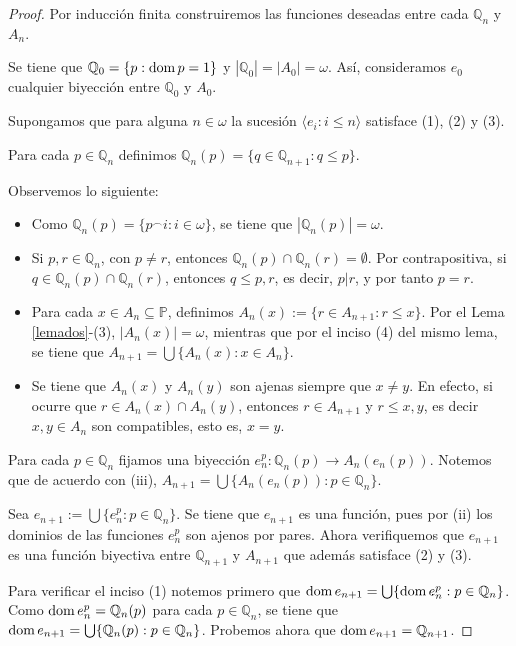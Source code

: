 \documentclass[11pt]{unam_tesis1}
\theoremstyle{MyThmStyle}
\theoremstyle{definition}
\theoremstyle{plain}
\theoremstyle{remark}
\def\dom{\mathop{\rm dom}\nolimits}
\let\leq\leqslant
\begin{document}
\begin{proof}
Por inducci\'on finita construiremos las funciones deseadas entre cada $\mathbb Q_n$ y $A_n$.

Se tiene que $\mathbb Q_0=\{p: \dom p=1\}$ y $|\mathbb Q_0|=|A_0|=\omega$. As\'i, consideramos $e_0$ cualquier biyecci\'on entre $\mathbb Q_0$ y $A_0$.

Supongamos que para alguna $n\in \omega$ la sucesi\'on $\langle e_i:i\leq n \rangle$ satisface (1), (2) y (3). 

Para cada $p\in \mathbb Q_n$ definimos $\mathbb Q_n(p)=\{q\in \mathbb Q_{n+1}:q\leq p\}$.

Observemos lo siguiente:

\begin{itemize}

\item [(i)]Como $\mathbb Q_n(p)=\{p^{\frown} i:i\in \omega \}$, se tiene que $|\mathbb Q_n(p)|=\omega$.
\item [(ii)]Si $p,r\in \mathbb Q_n$, con $p\neq r$, entonces $\mathbb Q_n(p)\cap \mathbb Q_n(r)=\emptyset$. Por contrapositiva, si $q\in \mathbb Q_n(p)\cap \mathbb Q_n(r)$, entonces $q\leq p,r$, es decir, $p|r$, y por tanto $p=r$.
\item [(iii)]Para cada $x\in A_n\subseteq \mathbb P$, definimos $A_n(x):=\{r\in A_{n+1}:r\leq x \}$. Por el Lema \ref{lemados}-(3), $|A_n(x)|=\omega$, mientras que por el inciso (4) del mismo lema, se tiene que $A_{n+1}=\bigcup \{A_n(x): x\in A_n \}$.

\item [(iv)] Se tiene que $A_n(x)$ y $A_n(y)$ son ajenas siempre que $x\neq y$. En efecto, si ocurre que $r\in A_n(x)\cap A_n(y)$, entonces $r\in A_{n+1}$ y $r\leq x,y$, es decir $x,y\in A_n$ son compatibles, esto es, $x=y$.

\end{itemize}

Para cada $p\in \mathbb Q_n$ fijamos una biyecci\'on $e^{p}_n:\mathbb Q_n(p)\rightarrow A_n(e_n(p))$. Notemos que de acuerdo con (iii), $A_{n+1}=\bigcup \{A_n(e_n(p)):p\in \mathbb Q_n \}$.

Sea $e_{n+1}:=\bigcup \{e^{p}_n:p\in \mathbb Q_n\}$. Se tiene que $e_{n+1}$ es una funci\'on, pues por (ii) los dominios de las funciones $e_n^p$ son ajenos por pares. Ahora verifiquemos que $e_{n+1}$ es una funci\'on biyectiva entre $\mathbb Q_{n+1}$ y $A_{n+1}$ que adem\'as satisface (2) y (3).

Para verificar el inciso (1) notemos primero que $\dom e_{n+1}=\bigcup \{\dom e_n^p: p\in \mathbb{Q}_n \}$. Como $\dom e_n^p= \mathbb Q_n(p)$ para cada $p\in \mathbb Q_n$, se tiene que $\dom e_{n+1}=\bigcup \{\mathbb Q_n(p):p\in \mathbb Q_n \}$. Probemos ahora que $\dom e_{n+1}=\mathbb Q_{n+1}$.


\end{proof}
\end{document}
